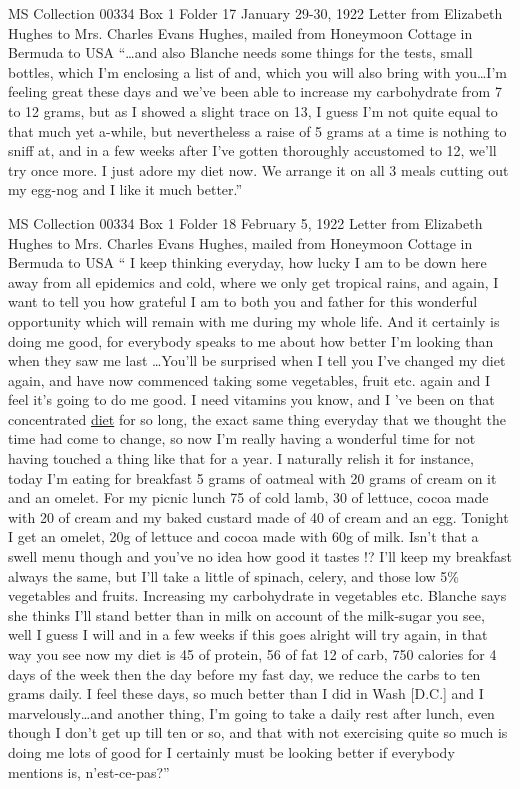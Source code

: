 \documentclass[12pt]{article}
\begin{document}
MS Collection 00334
Box 1 Folder 17
January 29-30, 1922
Letter from Elizabeth Hughes to Mrs. Charles Evans Hughes, mailed from Honeymoon Cottage in Bermuda to USA
``\dots and also Blanche needs some things for the tests, small bottles, which I'm enclosing a list of and, which you will also bring with you\dots I'm feeling great these days and we've been able to increase my carbohydrate from 7 to 12 grams, but as I showed a slight trace on 13, I guess I'm not quite equal to that much yet a-while, but nevertheless a raise of 5 grams at a time is nothing to sniff at, and in a few weeks after I've gotten thoroughly accustomed to 12, we'll try once more. I just adore my diet now. We arrange it on all 3 meals cutting out my egg-nog and I like it much better.'' 

MS Collection 00334
Box 1 Folder 18
February 5, 1922
Letter from Elizabeth Hughes to Mrs. Charles Evans Hughes, mailed from Honeymoon Cottage in Bermuda to USA
`` I keep thinking everyday, how lucky I am to be down here away from all epidemics and cold, where we only get tropical rains, and again, I want to tell you how grateful I am to both you and father for this wonderful opportunity which will remain with me during my whole life. And it certainly is doing me good, for everybody speaks to me about how  better I'm looking than when they saw me last \dots You'll be surprised when I tell you I've changed my diet again, and have now commenced taking some vegetables, fruit etc. again and I feel it's going to do me good. I need vitamins you know, and I 've been on that concentrated \underline{diet} for so long, the exact same thing everyday that we thought the time had come to change, so now I'm really having a wonderful time for not having touched a thing like that for a year. I naturally relish it for instance, today I'm eating for breakfast 5 grams of oatmeal with 20 grams of cream on it and an omelet. For my picnic lunch 75 of cold lamb, 30 of lettuce, cocoa made with 20 of cream and my baked custard made of 40 of cream and an egg. Tonight I get an omelet, 20g of lettuce and cocoa made with 60g of milk. Isn't that a swell menu though and you've no idea how good it tastes !? I'll keep my breakfast always the same, but I'll take a little of spinach, celery, and those low 5\% vegetables and fruits. Increasing my carbohydrate in vegetables etc. Blanche says she thinks I'll stand better than in milk on account of the milk-sugar you see, well I guess I will and in a few weeks if this goes alright will try again, in that way you see now my diet is 45 of protein, 56 of fat 12 of carb, 750 calories for 4 days of the week then the day before my fast day, we reduce the carbs to ten grams daily. I feel  these days, so much better than I did in Wash [D.C.] and I  marvelously\dots and another thing, I'm going to take a daily rest after lunch, even though I don't get up till ten or so, and that with not exercising quite so much is doing me lots of good for I certainly must be looking better if everybody mentions is, n'est-ce-pas?''
\end{document}

